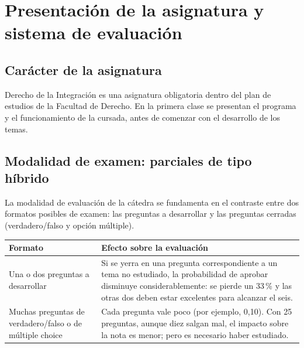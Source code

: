 \documentclass[12pt,oneside]{book}
\begin{document}
\tableofcontents

\mainmatter


\chapter{Presentación de la asignatura y sistema de evaluación}

\section{Carácter de la asignatura}

Derecho de la Integración es una asignatura obligatoria dentro del plan de estudios de la Facultad de Derecho. En la primera clase se presentan el programa y el funcionamiento de la cursada, antes de comenzar con el desarrollo de los temas.

\section{Modalidad de examen: parciales de tipo híbrido}

La modalidad de evaluación de la cátedra se fundamenta en el contraste entre dos formatos posibles de examen: las preguntas a desarrollar y las preguntas cerradas (verdadero/falso y opción múltiple).

\begin{table}[H]
\centering
\small
\renewcommand{\arraystretch}{1.3}
\begin{tabularx}{\textwidth}{
    >{\raggedright\arraybackslash}p{}
    >{\raggedright\arraybackslash}X
}
\toprule
\textbf{Formato} & \textbf{Efecto sobre la evaluación} \\
\midrule
Una o dos preguntas a desarrollar &
Si se yerra en una pregunta correspondiente a un tema no estudiado, la probabilidad de aprobar disminuye considerablemente: se pierde un 33\,\% y las otras dos deben estar excelentes para alcanzar el seis. \\
\addlinespace
Muchas preguntas de verdadero/falso o de múltiple choice &
Cada pregunta vale poco (por ejemplo, 0,10). Con 25 preguntas, aunque diez salgan mal, el impacto sobre la nota es menor; pero es necesario haber estudiado. \\
\bottomrule
\end{tabularx}
\end{table}
\end{document}
